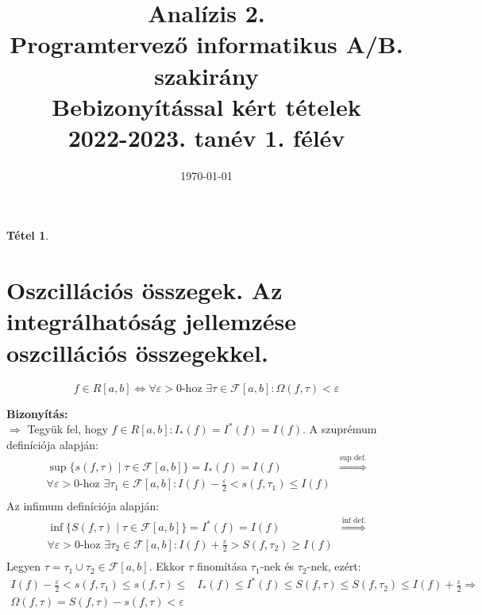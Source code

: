 \documentclass{article}
\date{\today}
\author{}
\title{%
	\textbf{Analízis 2.} \\
	\textbf{Programtervező informatikus A/B. szakirány} \\
	\medskip
	Bebizonyítással kért tételek\\
	\large 2022-2023. tanév 1. félév
}
\newtheorem{theorem}{Tétel}
\renewenvironment{proof}{\textbf{Bizonyítás:} \\}{\hfill}
\begin{document}
\maketitle
\tableofcontents
\newpage

\begin{theorem}
\section{Oszcillációs összegek. Az integrálhatóság jellemzése oszcillációs összegekkel.}
\begin{equation*}
    f\in R[a,b] \Longleftrightarrow \forall \varepsilon > 0\textrm{-hoz }\exists\tau \in\mathcal{F}[a,b]: \Omega (f,\tau)<\varepsilon
\end{equation*}
\end{theorem}
\begin{proof}
$\boxed{\Longrightarrow}$ Tegyük fel, hogy $f\in R[a,b]: I_*(f)=I^*(f)=I(f)$. A szuprémum definíciója alapján:
\begin{equation*}
\begin{split}
    \operatorname{sup}\{s(f,\tau) \mid \tau \in \mathcal{F}[a,b]\} =I_*(f)=I(f) & \overset{\textrm{sup def.}}{\Longrightarrow} \\
    \forall \varepsilon > 0\textrm{-hoz }\exists \tau_1\in \mathcal{F}[a,b]:I(f)-\frac{\varepsilon}{2}<s(f,\tau_1)\leq I(f) \\
\end{split}
\end{equation*}
Az infimum definíciója alapján:
\begin{equation*}
\begin{split}
    \operatorname{inf}\{S(f,\tau) \mid \tau \in \mathcal{F}[a,b]\} =I^*(f)=I(f) & \overset{\textrm{inf def.}}{\Longrightarrow} \\
    \forall \varepsilon > 0\textrm{-hoz }\exists \tau_2\in \mathcal{F}[a,b]:I(f)+\frac{\varepsilon}{2}>S(f,\tau_2)\geq I(f) \\
\end{split}
\end{equation*}
Legyen $\tau=\tau_1\cup\tau_2\in\mathcal{F}[a,b]$. Ekkor $\tau$ finomítása $\tau_1$-nek és $\tau_2$-nek, ezért:
\begin{equation*}
\begin{split}
    I(f)-\frac{\varepsilon}{2}<s(f,\tau_1)\leq s(f,\tau)\leq& I_*(f)\leq I^*(f)\leq S(f,\tau)\leq S(f,\tau_2)\leq I(f)+\frac{\varepsilon}{2} \Longrightarrow \\
    \Omega(f,\tau)=S(f,\tau)-s(f,\tau)<\varepsilon \\

\end{split}
\end{equation*}
\end{proof}
\end{document}
